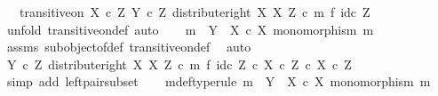\begin{isabellebody}
\ \ \ {\isachardoublequoteopen}transitive{\isacharunderscore}{\kern0pt}on\ {\isacharparenleft}{\kern0pt}X\ {\isasymtimes}\isactrlsub c\ Z{\isacharparenright}{\kern0pt}\ {\isacharparenleft}{\kern0pt}Y\ {\isasymtimes}\isactrlsub c\ Z{\isacharcomma}{\kern0pt}\ distribute{\isacharunderscore}{\kern0pt}right\ X\ X\ Z\ {\isasymcirc}\isactrlsub c\ {\isacharparenleft}{\kern0pt}m\ {\isasymtimes}\isactrlsub f\ id\isactrlsub c\ Z{\isacharparenright}{\kern0pt}{\isacharparenright}{\kern0pt}{\isachardoublequoteclose}\isanewline
%
\isadelimproof
%
\endisadelimproof
%
\isatagproof
{}\isamarkupfalse%
\ {\isacharparenleft}{\kern0pt}unfold\ transitive{\isacharunderscore}{\kern0pt}on{\isacharunderscore}{\kern0pt}def{\isacharcomma}{\kern0pt}\ auto{\isacharparenright}{\kern0pt}\isanewline
\ \ \isamarkupfalse%
\ {\isachardoublequoteopen}m\ {\isacharcolon}{\kern0pt}\ Y\ {\isasymrightarrow}\ X\ {\isasymtimes}\isactrlsub c\ X{\isachardoublequoteclose}\ {\isachardoublequoteopen}monomorphism\ m{\isachardoublequoteclose}\isanewline
\ \ \ \ \isamarkupfalse%
\ assms\ subobject{\isacharunderscore}{\kern0pt}of{\isacharunderscore}{\kern0pt}def{}\ transitive{\isacharunderscore}{\kern0pt}on{\isacharunderscore}{\kern0pt}def\ \isamarkupfalse%
\ auto\isanewline
\ \ \isamarkupfalse%
\ \isamarkupfalse%
\ {\isachardoublequoteopen}{\isacharparenleft}{\kern0pt}Y\ {\isasymtimes}\isactrlsub c\ Z{\isacharcomma}{\kern0pt}\ distribute{\isacharunderscore}{\kern0pt}right\ X\ X\ Z\ {\isasymcirc}\isactrlsub c\ m\ {\isasymtimes}\isactrlsub f\ id\isactrlsub c\ Z{\isacharparenright}{\kern0pt}\ {\isasymsubseteq}\isactrlsub c\ {\isacharparenleft}{\kern0pt}X\ {\isasymtimes}\isactrlsub c\ Z{\isacharparenright}{\kern0pt}\ {\isasymtimes}\isactrlsub c\ X\ {\isasymtimes}\isactrlsub c\ Z{\isachardoublequoteclose}\isanewline
\ \ \ \ \isamarkupfalse%
\ {\isacharparenleft}{\kern0pt}simp\ add{\isacharcolon}{\kern0pt}\ left{\isacharunderscore}{\kern0pt}pair{\isacharunderscore}{\kern0pt}subset{\isacharparenright}{\kern0pt}\isanewline
{}\isamarkupfalse%
\isanewline
\ \ \isamarkupfalse%
\ m{\isacharunderscore}{\kern0pt}def{\isacharbrackleft}{\kern0pt}type{\isacharunderscore}{\kern0pt}rule{\isacharbrackright}{\kern0pt}{\isacharcolon}{\kern0pt}\ {\isachardoublequoteopen}m\ {\isacharcolon}{\kern0pt}\ Y\ {\isasymrightarrow}\ X\ {\isasymtimes}\isactrlsub c\ X{\isachardoublequoteclose}\ {\isachardoublequoteopen}monomorphism\ m{\isachardoublequoteclose}\isanewline

\end{isabellebody}
